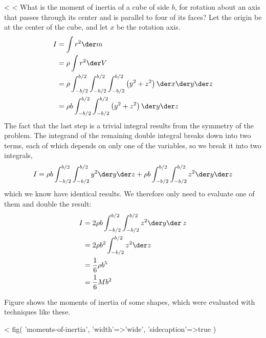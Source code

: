 <%
<%
What is the moment of inertia of a cube of side $b$,
for rotation about an axis that passes through its center
and is parallel to four of its faces?
Let the origin be at the center of the cube, and
let $x$ be the rotation axis.
\begin{align*}
        I        &=  \int r^2 \der m \\
                &= \rho \int r^2 \der V \\
                &= \rho \int_{-b/2}^{b/2} \int_{-b/2}^{b/2} \int_{-b/2}^{b/2} \left(y^2+z^2\right)
                                         \der x\der y\der z \\
                &= \rho b \int_{-b/2}^{b/2} \int_{-b/2}^{b/2}  \left(y^2+z^2\right)
                                         \der y \der z 
\end{align*}
The fact that the last step is a trivial integral results
from the symmetry of the problem. The integrand of the
remaining double integral breaks down into two terms, each
of which depends on only one of the variables, so we break
it into two integrals,
\begin{equation*}
                I = \rho b \int_{-b/2}^{b/2} \int_{-b/2}^{b/2}  y^2 \der y\der z
                        + \rho b \int_{-b/2}^{b/2} \int_{-b/2}^{b/2}  z^2 \der y\der z
\end{equation*}
which we know have identical results. We therefore only need
to evaluate one of them and double the result:
\begin{align*}
        I        &= 2\rho b \int_{-b/2}^{b/2} \int_{-b/2}^{b/2}  z^2 \der y\der\: z \\
                &= 2 \rho b^2 \int_{-b/2}^{b/2} z^2 \der z \\
                &= \frac{1}{6} \rho b^5 \\
                &= \frac{1}{6} M b^2
\end{align*}

Figure  shows the moments of inertia of some
shapes, which were evaluated with techniques like these.

<%
  fig(
    'moments-of-inertia',
    {
      'width'=>'wide',
      'sidecaption'=>true
    }
  )

